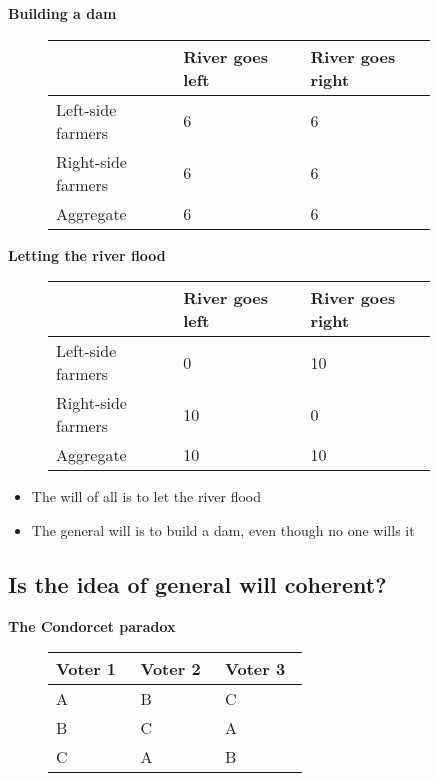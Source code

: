 \textbf{Building a dam}

\begin{figure}[H]
	\begin{tabular}{|p{0.3\linewidth}|p{0.3\linewidth}|p{0.3\linewidth}|}
	\hline
	& River goes left & River goes right \\
	\hline
	Left-side farmers & 6 & 6 \\
	\hline
	Right-side farmers & 6 & 6 \\
	\hline
	Aggregate & 6 & 6 \\
	\hline
	\end{tabular}
\end{figure}

\textbf{Letting the river flood}

\begin{figure}[H]
	\begin{tabular}{|p{0.3\linewidth}|p{0.3\linewidth}|p{0.3\linewidth}|}
	\hline
	& River goes left & River goes right \\
	\hline
	Left-side farmers & 0 & 10 \\
	\hline
	Right-side farmers & 10 & 0 \\
	\hline
	Aggregate & 10 & 10 \\
	\hline
	\end{tabular}
\end{figure}

\begin{itemize}
	\item The will of all is to let the river flood
	\item The general will is to build a dam, even though no one wills it
\end{itemize}

\subsection{Is the idea of general will coherent?}

\textbf{The Condorcet paradox}

\begin{figure}[H]
	\begin{tabular}{p{0.3\linewidth}p{0.3\linewidth}p{0.3\linewidth}|}
	Voter 1 & Voter 2 & Voter 3 \\
	\hline
	A & B & C \\
	B & C & A \\
	C & A & B \\
	\end{tabular}
\end{figure}

